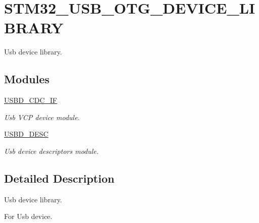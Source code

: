 \hypertarget{group__STM32__USB__OTG__DEVICE__LIBRARY}{}\section{S\+T\+M32\+\_\+\+U\+S\+B\+\_\+\+O\+T\+G\+\_\+\+D\+E\+V\+I\+C\+E\+\_\+\+L\+I\+B\+R\+A\+RY}
\label{group__STM32__USB__OTG__DEVICE__LIBRARY}


Usb device library.  


\subsection*{Modules}
\begin{DoxyCompactItemize}
\item 
\hyperlink{group__USBD__CDC__IF}{U\+S\+B\+D\+\_\+\+C\+D\+C\+\_\+\+IF}
\begin{DoxyCompactList}\small\item\em Usb V\+CP device module. \end{DoxyCompactList}\item 
\hyperlink{group__USBD__DESC}{U\+S\+B\+D\+\_\+\+D\+E\+SC}
\begin{DoxyCompactList}\small\item\em Usb device descriptors module. \end{DoxyCompactList}\end{DoxyCompactItemize}


\subsection{Detailed Description}
Usb device library. 

For Usb device.
